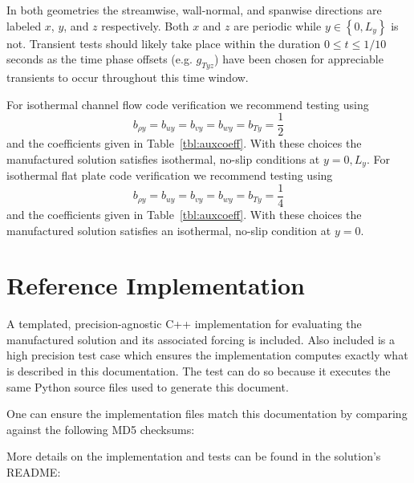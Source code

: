 \documentclass[10pt,reqno]{amsart}
\begin{document}
In both geometries the streamwise, wall-normal, and spanwise directions are
labeled $x$, $y$, and $z$ respectively.  Both $x$ and $z$ are periodic while
$y\in\left\{0,L_y\right\}$ is not.  Transient tests should likely take place
within the duration $0\leq{}t\leq{}1/10$ seconds as the time phase offsets
(e.g. $g_{Tyz}$) have been chosen for appreciable transients to occur
throughout this time window.

For isothermal channel flow code verification we recommend testing using
\begin{equation*}
  b_{\rho{}y} =
  b_{u{}y}    =
  b_{v{}y}    =
  b_{w{}y}    =
  b_{T{}y}    = \frac{1}{2}
\end{equation*}
and the coefficients given in Table~\ref{tbl:auxcoeff}.  With these choices
the manufactured solution satisfies isothermal, no-slip conditions at $y = 0,
L_y$.  For isothermal flat plate code verification we recommend testing using
\begin{equation*}
  b_{\rho{}y} =
  b_{u{}y}    =
  b_{v{}y}    =
  b_{w{}y}    =
  b_{T{}y}    = \frac{1}{4}
\end{equation*}
and the coefficients given in Table~\ref{tbl:auxcoeff}.  With these choices
the manufactured solution satisfies an isothermal, no-slip condition at $y =
0$.

\section{Reference Implementation}

A templated, precision-agnostic C++ implementation for evaluating the
manufactured solution and its associated forcing is included.  Also included is
a high precision test case which ensures the implementation computes exactly
what is described in this documentation.  The test can do so because it
executes the same Python source files used to generate this document.

One can ensure the implementation files match this documentation by comparing
against the following MD5 checksums:



More details on the implementation and tests can be found in the solution's
README:


\end{document}

